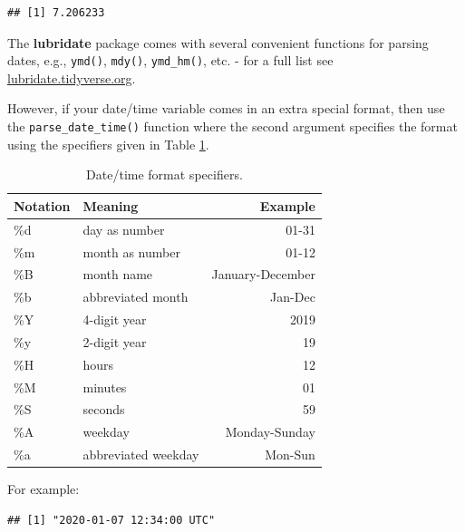 \documentclass[
  12pt,
  krantz2]{krantz}
\makeatletter
\newenvironment{Shaded}{\begin{snugshade}}{\end{snugshade}}
\newcommand{\KeywordTok}[1]{\textcolor[rgb]{0.13,0.29,0.53}{\textbf{#1}}}
\newcommand{\NormalTok}[1]{#1}
\newcommand{\StringTok}[1]{\textcolor[rgb]{0.31,0.60,0.02}{#1}}
\newenvironment{kframe}{%
\medskip{}
\setlength{\fboxsep}{.8em}
 \def\at@end@of@kframe{}%
 \ifinner\ifhmode%
  \def\at@end@of@kframe{\end{minipage}}%
  \begin{minipage}{\columnwidth}%
 \fi\fi%
 \def\FrameCommand##1{\hskip\@totalleftmargin \hskip-\fboxsep
 \colorbox{shadecolor}{##1}\hskip-\fboxsep
     \hskip-\linewidth \hskip-\@totalleftmargin \hskip\columnwidth}%
 \MakeFramed {\advance\hsize-\width
   \@totalleftmargin\z@ \linewidth\hsize
   \@setminipage}}%
 {\par\unskip\endMakeFramed%
 \at@end@of@kframe}
\renewenvironment{Shaded}{\begin{kframe}}{\end{kframe}}
\makeatother
\begin{document}
\begin{verbatim}
## [1] 7.206233
\end{verbatim}

The \textbf{lubridate} package comes with several convenient functions for parsing dates, e.g., \texttt{ymd()}, \texttt{mdy()}, \texttt{ymd\_hm()}, etc. - for a full list see \url{lubridate.tidyverse.org}.

However, if your date/time variable comes in an extra special format, then use the \texttt{parse\_date\_time()} function where the second argument specifies the format using the specifiers given in Table \ref{tab:chap2-tab-timehelpers}.

\begin{table}[!h]

\caption{\label{tab:chap2-tab-timehelpers}Date/time format specifiers.}
\centering
\fontsize{9}{11}\selectfont
\begin{tabular}[t]{llr}
\toprule
Notation & Meaning & Example\\
\midrule
\%d & day as number & 01-31\\
\%m & month as number & 01-12\\
\%B & month name & January-December\\
\%b & abbreviated month & Jan-Dec\\
\%Y & 4-digit year & 2019\\
\%y & 2-digit year & 19\\
\%H & hours & 12\\
\%M & minutes & 01\\
\%S & seconds & 59\\
\%A & weekday & Monday-Sunday\\
\%a & abbreviated weekday & Mon-Sun\\
\bottomrule
\end{tabular}
\end{table}

For example:

\begin{Shaded}
\end{Shaded}

\begin{verbatim}
## [1] "2020-01-07 12:34:00 UTC"
\end{verbatim}
\end{document}

